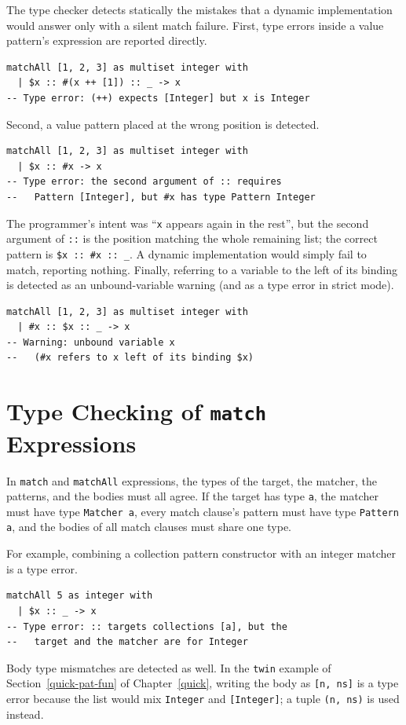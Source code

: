 The type checker detects statically the mistakes that a dynamic implementation would answer only with a silent match failure.
First, type errors inside a value pattern's expression are reported directly.
\begin{lstlisting}[language=egison,numbers=none]
matchAll [1, 2, 3] as multiset integer with
  | $x :: #(x ++ [1]) :: _ -> x
-- Type error: (++) expects [Integer] but x is Integer
\end{lstlisting}
Second, a value pattern placed at the wrong position is detected.
\begin{lstlisting}[language=egison,numbers=none]
matchAll [1, 2, 3] as multiset integer with
  | $x :: #x -> x
-- Type error: the second argument of :: requires
--   Pattern [Integer], but #x has type Pattern Integer
\end{lstlisting}
The programmer's intent was ``\lstinline{x} appears again in the rest'', but the second argument of \lstinline{::} is the position matching the whole remaining list; the correct pattern is \lstinline{$x :: #x :: _}.
A dynamic implementation would simply fail to match, reporting nothing.
Finally, referring to a variable to the left of its binding is detected as an unbound-variable warning (and as a type error in strict mode).
\begin{lstlisting}[language=egison,numbers=none]
matchAll [1, 2, 3] as multiset integer with
  | #x :: $x :: _ -> x
-- Warning: unbound variable x
--   (#x refers to x left of its binding $x)
\end{lstlisting}

\section{Type Checking of \texttt{match} Expressions}\label{matcher-match-typing}

In \lstinline{match} and \lstinline{matchAll} expressions, the types of the target, the matcher, the patterns, and the bodies must all agree.
If the target has type \lstinline{a}, the matcher must have type \lstinline{Matcher a}, every match clause's pattern must have type \lstinline{Pattern a}, and the bodies of all match clauses must share one type.

For example, combining a collection pattern constructor with an integer matcher is a type error.
\begin{lstlisting}[language=egison,numbers=none]
matchAll 5 as integer with
  | $x :: _ -> x
-- Type error: :: targets collections [a], but the
--   target and the matcher are for Integer
\end{lstlisting}
Body type mismatches are detected as well.
In the \lstinline{twin} example of Section~\ref{quick-pat-fun} of Chapter~\ref{quick}, writing the body as \lstinline{[n, ns]} is a type error because the list would mix \lstinline{Integer} and \lstinline{[Integer]}; a tuple \lstinline{(n, ns)} is used instead.

